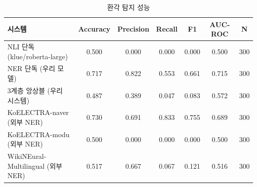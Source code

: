 \begin{table}[ht]
\centering
\caption{환각 탐지 성능}
\label{tab:hallucination}
\begin{tabular}{lcccccc}
\toprule
시스템 & Accuracy & Precision & Recall & F1 & AUC-ROC & N \\
\midrule
NLI 단독 (klue/roberta-large) & 0.500 & 0.000 & 0.000 & 0.000 & 0.500 & 300 \\
NER 단독 (우리 모델) & 0.717 & 0.822 & 0.553 & 0.661 & 0.715 & 300 \\
3계층 앙상블 (우리 시스템) & 0.487 & 0.389 & 0.047 & 0.083 & 0.572 & 300 \\
KoELECTRA-naver (외부 NER) & 0.730 & 0.691 & 0.833 & 0.755 & 0.689 & 300 \\
KoELECTRA-modu (외부 NER) & 0.500 & 0.000 & 0.000 & 0.000 & 0.500 & 300 \\
WikiNEural-Multilingual (외부 NER) & 0.517 & 0.667 & 0.067 & 0.121 & 0.516 & 300 \\
\bottomrule
\end{tabular}
\end{table}
